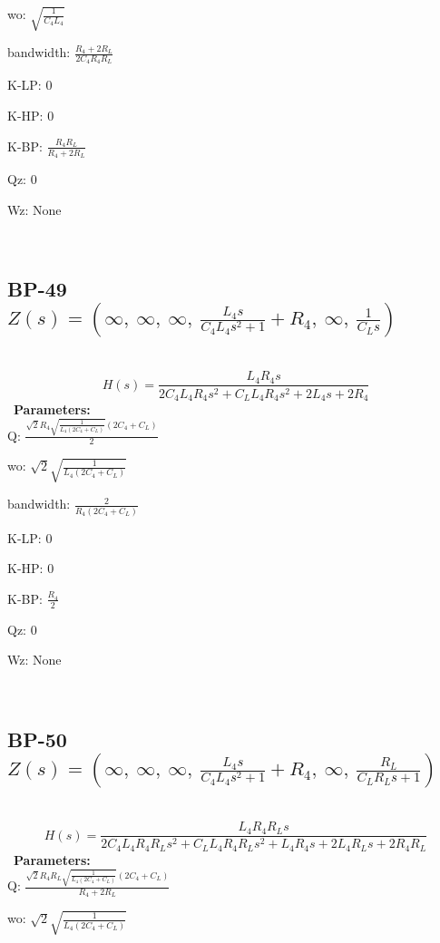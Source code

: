 \documentclass{article}
\begin{document}
wo: $\sqrt{\frac{1}{C_{4} L_{4}}}$\ 

bandwidth: $\frac{R_{4} + 2 R_{L}}{2 C_{4} R_{4} R_{L}}$\ 

K-LP: $0$\ 

K-HP: $0$\ 

K-BP: $\frac{R_{4} R_{L}}{R_{4} + 2 R_{L}}$\ 

Qz: $0$\ 

Wz: $\text{None}$\ 

\ 

\subsection{BP-49 $Z(s) = \left( \infty, \  \infty, \  \infty, \  \frac{L_{4} s}{C_{4} L_{4} s^{2} + 1} + R_{4}, \  \infty, \  \frac{1}{C_{L} s}\right)$ } \ 
\textbf{\[H(s) = \frac{L_{4} R_{4} s}{2 C_{4} L_{4} R_{4} s^{2} + C_{L} L_{4} R_{4} s^{2} + 2 L_{4} s + 2 R_{4}}\] } \ 
\textbf{Parameters:}\\ 

Q: $\frac{\sqrt{2} R_{4} \sqrt{\frac{1}{L_{4} \left(2 C_{4} + C_{L}\right)}} \left(2 C_{4} + C_{L}\right)}{2}$\ 

wo: $\sqrt{2} \sqrt{\frac{1}{L_{4} \left(2 C_{4} + C_{L}\right)}}$\ 

bandwidth: $\frac{2}{R_{4} \left(2 C_{4} + C_{L}\right)}$\ 

K-LP: $0$\ 

K-HP: $0$\ 

K-BP: $\frac{R_{4}}{2}$\ 

Qz: $0$\ 

Wz: $\text{None}$\ 

\ 

\subsection{BP-50 $Z(s) = \left( \infty, \  \infty, \  \infty, \  \frac{L_{4} s}{C_{4} L_{4} s^{2} + 1} + R_{4}, \  \infty, \  \frac{R_{L}}{C_{L} R_{L} s + 1}\right)$ } \ 
\textbf{\[H(s) = \frac{L_{4} R_{4} R_{L} s}{2 C_{4} L_{4} R_{4} R_{L} s^{2} + C_{L} L_{4} R_{4} R_{L} s^{2} + L_{4} R_{4} s + 2 L_{4} R_{L} s + 2 R_{4} R_{L}}\] } \ 
\textbf{Parameters:}\\ 

Q: $\frac{\sqrt{2} R_{4} R_{L} \sqrt{\frac{1}{L_{4} \left(2 C_{4} + C_{L}\right)}} \left(2 C_{4} + C_{L}\right)}{R_{4} + 2 R_{L}}$\ 

wo: $\sqrt{2} \sqrt{\frac{1}{L_{4} \left(2 C_{4} + C_{L}\right)}}$\ 
\end{document}
